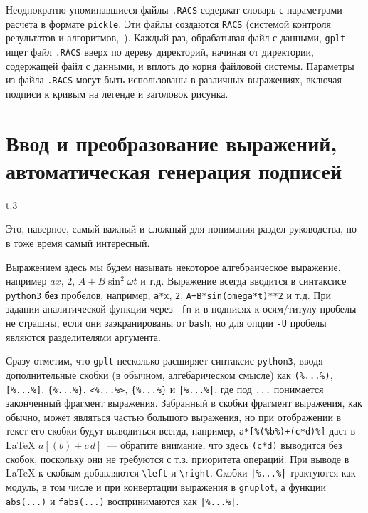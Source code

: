 \documentclass[12pt]{article}
\def\gplt{{\tt gplt}}
\def\gnuplot{{\tt gnuplot}}
\def\python{{\tt python3}}
\begin{document}
Неоднократно упоминавшиеся файлы \verb'.RACS' содержат словарь с параметрами расчета в формате \verb'pickle'.
Эти файлы создаются \verb'RACS' (системой контроля результатов и алгоритмов,~\cite{aiwlib:SR:PP2018}).
Каждый раз, обрабатывая файл с данными, \gplt{} ищет файл \verb'.RACS' вверх по дереву директорий, начиная от директории, содержащей файл с данными,
и вплоть до корня файловой системы. Параметры из файла \verb'.RACS' могут быть использованы в различных выражениях, включая подписи к кривым на легенде и
заголовок рисунка. 
\newpage

\section{Ввод и преобразование выражений, автоматическая генерация подписей}
\begin{wrapfigure}[8]{t}{.3\textwidth}
  \vphantom{.}
  \vspace{-1cm}

\end{wrapfigure}
Это, наверное, самый важный и сложный для понимания раздел руководства, но в тоже время самый интересный. 

Выражением здесь мы будем называть некоторое алгебраическое выражение, например $a x$, $2$, $A + B\sin^2\omega t$ и т.д. Выражение всегда вводится
в синтаксисе \python{} {\bf без} пробелов, например, \verb'a*x', \verb'2', \verb'A+B*sin(omega*t)**2' и т.д.
При задании аналитической функции через {\tt -fn} и в подписях к осям/титулу пробелы не страшны, если они
  заэкранированы от {\tt bash}, но для опции {\tt -U} пробелы являются разделителями аргумента. 

  Сразу отметим, что \gplt{} несколько расширяет синтаксис \python{}, вводя дополнительные скобки (в обычном, алгебарическом смысле) как
\verb'(%...%)', \verb'[%...%]', \verb'{%...%}', \verb'<%...%>', \verb'{%...%}' и \verb'|%...%|', где под \verb'...' понимается законченный фрагмент выражения.
Забранный в скобки фрагмент выражения, как обычно, может являться частью большого выражения, но при отображении в текст его скобки будут выводиться всегда, например,
\verb'a*[%(%b%)+(c*d)%]' даст в \LaTeX{}
$a[(b)+c\,d]$~--- обратите внимание, что здесь \verb'(c*d)' выводится без скобок, поскольку они не требуются
с т.з. приоритета операций. При выводе в \LaTeX{} к скобкам добавляются \verb'\left' и \verb'\right'. Скобки \verb'|%...%|' трактуются как модуль,
в том числе и при конвертации выражения в \gnuplot{}, а функции \verb'abs(...)' и \verb'fabs(...)' воспринимаются как \verb'|%...%|'.
\end{document}
